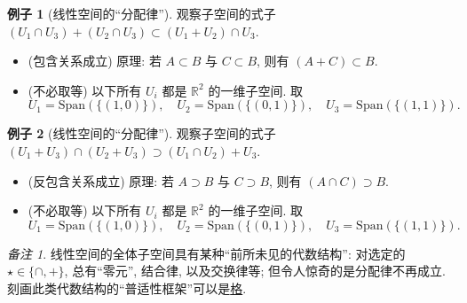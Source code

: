 \documentclass[11pt]{ctexart}
\theoremstyle{definition}
\numberwithin{equation}{section}
\theoremstyle{definition}
\newtheorem*{example}{例子}
\theoremstyle{remark}
\newtheorem*{remark}{备注}
\begin{document}
\begin{example}[线性空间的``分配律'']
    观察子空间的式子 $(U_1\cap U_3)+(U_2\cap U_3)\subset (U_1+U_2)\cap U_3$. 
    \begin{itemize}
        \item (包含关系成立) 原理: 若 $A\subset B$ 与 $C\subset B$, 则有 $(A+C)\subset B$. 
        \item (不必取等) 以下所有 $U_i$ 都是 $\mathbb R^2$ 的一维子空间. 取 
        \begin{equation}
            U_1=\mathrm{Span}(\{(1,0)\}),\quad  U_2=\mathrm{Span}(\{(0,1)\}),\quad  U_3=\mathrm{Span}(\{(1,1)\}). 
        \end{equation} 
    \end{itemize}
\end{example}


\begin{example}[线性空间的``分配律'']
    观察子空间的式子 $(U_1+ U_3)\cap (U_2+ U_3)\supset (U_1\cap U_2)+ U_3$. 
    \begin{itemize}
        \item (反包含关系成立) 原理: 若 $A\supset B$ 与 $C\supset B$, 则有 $(A\cap C)\supset B$. 
        \item (不必取等) 以下所有 $U_i$ 都是 $\mathbb R^2$ 的一维子空间. 取 
        \begin{equation}
            U_1=\mathrm{Span}(\{(1,0)\}),\quad  U_2=\mathrm{Span}(\{(0,1)\}),\quad  U_3=\mathrm{Span}(\{(1,1)\}). 
        \end{equation} 
    \end{itemize}
\end{example}

\begin{remark}
    线性空间的全体子空间具有某种``前所未见的代数结构'': 对选定的 $\star\in \{\cap ,+\}$, 总有``零元'', 结合律, 以及交换律等; 但令人惊奇的是分配律不再成立. 刻画此类代数结构的``普适性框架''可以是\href{https://en.wikipedia.org/wiki/Lattice_(order)}{格}. 
\end{remark}
\end{document}
